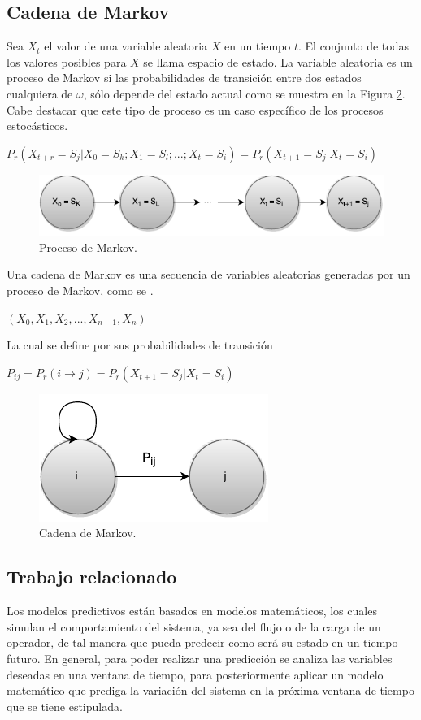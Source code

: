 \subsection{Cadena de Markov}
Sea $X_t$ el valor de una variable aleatoria $X$ en un tiempo $t$. El conjunto de todas los valores posibles para $X$ se llama espacio de estado. La variable aleatoria es un proceso de Markov si las probabilidades de transición entre dos estados cualquiera de $\omega$, sólo depende del estado actual como se muestra en la Figura \ref{fig:procesoMarkov}. Cabe destacar que este tipo de proceso es un caso específico de los procesos estocásticos.

$P_r(X_{t+r} = S_j | X_0 = S_k ; X_1 = S_l ; ... ; X_t = S_i) = P_r(X_{t+1} = S_j | X_t = S_i) $

\begin{figure}[ht!]
  \centering
    \includegraphics[scale=1]{images/ProcesoMarkov.pdf}
  \caption{Proceso de Markov.}
  \label{fig:procesoMarkov}
\end{figure}

Una cadena de Markov es una secuencia de variables aleatorias generadas por un proceso de Markov, como se .

$(X_0, X_1, X_2, ..., X_{n-1}, X_{n})$

La cual se define por sus probabilidades de transición

$P_{ij} = P_r(i \rightarrow j) = P_r(X_{t+1} = S_j | X_t = S_i)$

\begin{figure}[ht!]
  \centering
    \includegraphics[scale=1]{images/CadenaMarkov.pdf}
  \caption{Cadena de Markov.}
  \label{fig:procesoMarkov}
\end{figure}

\subsection{Trabajo relacionado}
Los modelos predictivos están basados en modelos matemáticos, los cuales simulan el comportamiento del sistema, ya sea del flujo o de la carga de un operador, de tal manera que pueda predecir como será su estado en un tiempo futuro. En general, para poder realizar una predicción se analiza las variables deseadas en una ventana de tiempo, para posteriormente aplicar un modelo matemático que prediga la variación del sistema en la próxima ventana de tiempo que se tiene estipulada.


